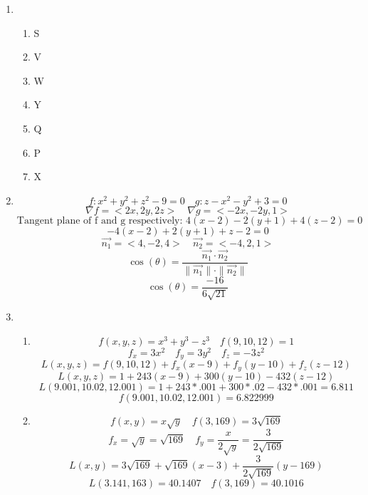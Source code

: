 \documentclass[12pt]{article}
\begin{document}
\begin{enumerate}
\item \begin{enumerate}
\item S
\item V
\item W
\item Y
\item Q
\item P
\item X
\end{enumerate}
\item $$f:x^2+y^2+z^2-9=0 \quad g:z-x^2-y^2+3=0$$
$$\nabla f = <2x,2y,2z> \quad \nabla g = <-2x,-2y,1>$$
$$\textrm{Tangent plane of f and g respectively: } 4(x-2)-2(y+1)+4(z-2)=0$$
$$-4(x-2)+2 (y+1)+z-2=0$$
$$\vec{n_1} = <4,-2,4> \quad \vec{n_2} = <-4, 2,1>$$
$$\cos(\theta) = \frac{\vec{n_1} \cdot \vec{n_2}}{\parallel \vec{n_1} \parallel \cdot \parallel \vec{n_2} \parallel}$$
$$\cos(\theta) = \frac{-16}{6\sqrt{21}}$$
\item \begin{enumerate}
\item $$f\left(x,y,z\right)=x^3+y^3-z^3 \quad f\left(9,10,12\right) = 1$$
$$f_x = 3x^2 \quad f_y = 3y^2 \quad f_z = -3z^2$$
$$L(x,y,z) = f(9,10,12) + f_x(x-9)+f_y(y-10)+f_z(z-12)$$
$$L(x,y,z) = 1 + 243(x-9)+300(y-10)-432(z-12)$$
$$L(9.001,10.02,12.001)=1+243*.001+300*.02-432*.001=6.811$$
$$f(9.001,10.02,12.001)=6.822999$$
\item $$f(x,y)=x\sqrt{y} \quad f(3,169)=3\sqrt{169}$$
$$f_x=\sqrt{y}=\sqrt{169} \quad f_y=\frac{x}{2\sqrt{y}}=\frac{3}{2\sqrt{169}}$$
$$L(x,y) = 3\sqrt{169} + \sqrt{169}(x-3) + \frac{3}{2\sqrt{169}}(y-169)$$
$$L(3.141,163)=40.1407 \quad f(3,169)=40.1016$$
\end{enumerate}


\end{enumerate}
\end{document}
